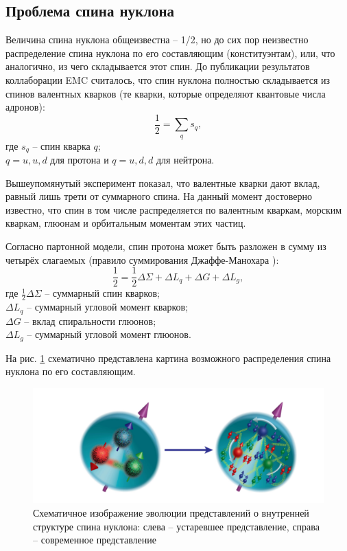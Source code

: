 \documentclass{extreport}
\begin{document}
\subsection{Проблема спина нуклона}
 Величина спина нуклона общеизвестна – 1/2, но до сих пор неизвестно распределение спина нуклона по его составляющим (конституэнтам), или, что аналогично, из чего складывается этот спин. До публикации результатов коллаборации EMC \cite{Arbuzov_2020} считалось, что спин нуклона полностью складывается из спинов валентных кварков (те кварки, которые определяют квантовые числа адронов):
 \begin{equation}
 	\frac{1}{2} = \sum_{q} s_q,
 \end{equation}
где $s_q$ -- спин кварка $q$; \\
$q = u, u, d$ для протона и $q = u, d, d$ для нейтрона.

Вышеупомянутый эксперимент показал, что валентные кварки дают вклад, равный лишь трети от суммарного спина. На данный момент достоверно известно, что спин в том числе распределяется по валентным кваркам, морским кваркам, глюонам и орбитальным моментам этих частиц. 
 
Согласно партонной модели, спин протона может быть разложен в сумму из четырёх слагаемых (правило суммирования Джаффе-Манохара \cite{Ji_2015}):
\begin{equation}
	\frac{1}{2} = \frac{1}{2} \Delta \Sigma + \Delta L_q + \Delta G + \Delta L_g,
\end{equation}
где $\frac{1}{2} \Delta \Sigma$ -- суммарный спин кварков; \\
$\Delta L_q$ -- суммарный угловой момент кварков; \\
$\Delta G$ -- вклад спиральности глюонов; \\
$\Delta L_g$ -- суммарный угловой момент глюонов.

 На рис. \ref{fig:nucleo} схематично представлена картина возможного распределения спина нуклона по его составляющим.
 
\begin{figure}[ht]
    \centering
    \includegraphics[width = 0.9\linewidth]{nucleo.png}
    \caption{Схематичное изображение эволюции представлений о внутренней структуре спина нуклона: слева – устаревшее представление, справа – современное представление}
    \label{fig:nucleo}
\end{figure}
 
\end{document}
